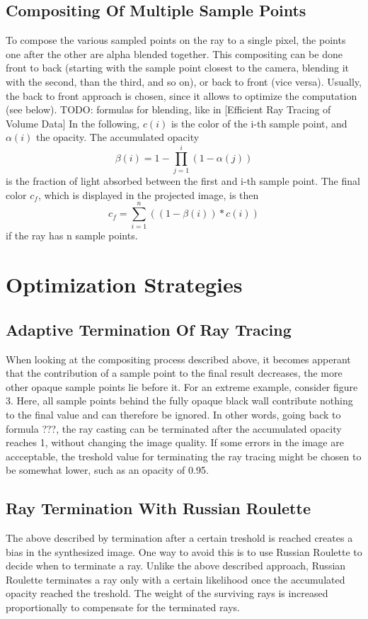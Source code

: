  \subsection{Compositing Of Multiple Sample Points}
To compose the various sampled points on the ray to a single pixel, the points one after the other are alpha blended together. This compositing can be done front to back (starting with the sample point closest to the camera, blending it with the second, than the third, and so on), or back to front (vice versa).  Usually, the back to front approach is chosen, since it allows to optimize the computation (see below).
 TODO: formulas for blending, like in [Efficient Ray Tracing of Volume Data]
 In the following, $c(i)$ is the color of the i-th sample point, and $\alpha(i)$ the opacity. The accumulated opacity 
 \begin{equation}
 \beta(i) = 1 - \prod_{j=1}^{i}(1 - \alpha(j))
 \end{equation}
 is the fraction of light absorbed between the first and i-th sample point. The final color $c_f$, which is displayed in the projected image, is then
 \begin{equation}
 c_f = \sum_{i=1}^n((1-\beta(i)) * c(i))
 \end{equation}
 if the ray has n sample points.
\section{Optimization Strategies}
\subsection{Adaptive Termination Of Ray Tracing}
When looking at the compositing process described above, it becomes apperant that the contribution of a sample point to the final result decreases, the more other opaque sample points lie before it. For an extreme example, consider figure 3. Here, all sample points behind the fully opaque black wall contribute nothing to the final value and can therefore be ignored. In other words, going back to formula ???, the ray casting can be terminated after the accumulated opacity reaches 1, without changing the image quality. If some errors in the image are accceptable, the treshold value for terminating the ray tracing might be chosen to be somewhat lower, such as an opacity of 0.95.
\subsection{Ray Termination With Russian Roulette}
The above described by termination after a certain treshold is reached creates a bias in the synthesized image\cite{10.1145/97880.97886}. One way to avoid this is to use Russian Roulette to decide when to terminate a ray\cite{10.1145/147130.147155}. Unlike the above described approach,  Russian Roulette terminates a ray only with a certain likelihood once the accumulated opacity reached the treshold. The weight of the surviving rays is increased proportionally to compensate for the terminated rays.
